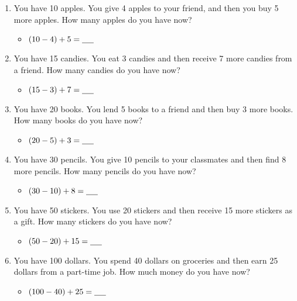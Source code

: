 \begin{enumerate}[label=(\alph*)]  
    \item You have 10 apples. You give 4 apples to your friend, and then you buy 5 more apples. How many apples do you have now?
    \begin{itemize}
        \item $(10 - 4) + 5 = \underline{\hspace{0.5cm}}$
    \end{itemize}
    \item You have 15 candies. You eat 3 candies and then receive 7 more candies from a friend. How many candies do you have now?
    \begin{itemize}
        \item $(15 - 3) + 7 = \underline{\hspace{0.5cm}}$
    \end{itemize}    
    \item You have 20 books. You lend 5 books to a friend and then buy 3 more books. How many books do you have now?
    \begin{itemize}
        \item $(20 - 5) + 3 = \underline{\hspace{0.5cm}}$
    \end{itemize}
    \item You have 30 pencils. You give 10 pencils to your classmates and then find 8 more pencils. How many pencils do you have now?
    \begin{itemize}
        \item $(30 - 10) + 8 = \underline{\hspace{0.5cm}}$
    \end{itemize}
    \item You have 50 stickers. You use 20 stickers and then receive 15 more stickers as a gift. How many stickers do you have now?
    \begin{itemize}
        \item $(50 - 20) + 15 = \underline{\hspace{0.5cm}}$
    \end{itemize}
    \item You have 100 dollars. You spend 40 dollars on groceries and then earn 25 dollars from a part-time job. How much money do you have now?
    \begin{itemize}
        \item $(100 - 40) + 25 = \underline{\hspace{0.5cm}}$
    \end{itemize}

\end{enumerate}
